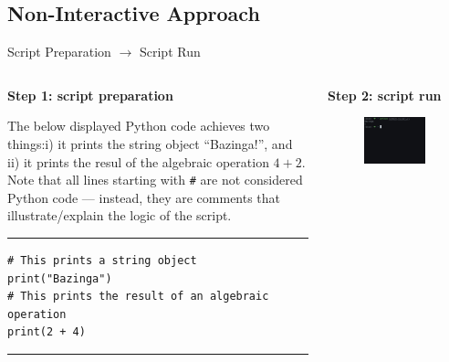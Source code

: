 \documentclass[aspectratio=1610]{beamer}
\begin{document}
\subsection{Non-Interactive Approach}

\begin{frame}[fragile]{Script Preparation $\rightarrow$ Script Run}
	\begin{columns}[t]
		\begin{column}{0.5\textwidth}		
		\textbf{Step 1: script preparation}	
		
		\vspace{1em}
		
		The below displayed Python code achieves two things:i) it prints the string object ``Bazinga!'', and ii) it prints the resul of the algebraic operation $4 + 2$. Note that all lines starting with \texttt{\#} are not considered Python code --- instead, they are comments that illustrate/explain the logic of the script.
		
		\rule{\textwidth}{1pt}
		\scriptsize
		\begin{verbatim}
# This prints a string object
print("Bazinga")
# This prints the result of an algebraic operation
print(2 + 4)
	    \end{verbatim}
		\rule{\textwidth}{1pt}
		
		\end{column}
		\begin{column}{0.5\textwidth}
		\textbf{Step 2: script run}	
		
		\vspace{1em}
		
	\begin{figure}
		\includegraphics[width=0.92\textwidth]{images/simple_script}
	\end{figure}
		\end{column}
	\end{columns}
\end{frame}
\end{document}
